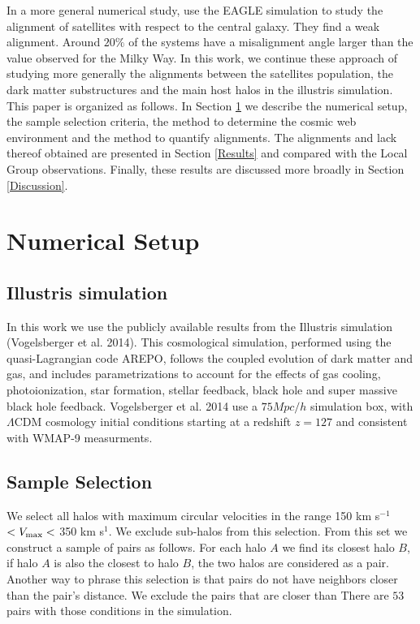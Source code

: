 \documentclass{emulateapj}
\begin{document}
In a more general numerical study,   
\cite{2016arXiv160501728S} use the EAGLE simulation to study the
alignment of satellites with respect to the central galaxy. They find
a weak alignment. Around $20\%$ of the systems have a misalignment
angle larger than the value observed for the Milky Way.
In this work, we continue these approach of studying more generally the alignments between the satellites population, the dark matter substructures and the main host halos in the illustris simulation. This paper is organized as follows. 
In Section \ref{NumericalSetup} we describe the numerical setup, the sample selection criteria, the method to determine the cosmic web environment and the method to quantify alignments. 
The alignments and lack thereof obtained are presented in Section \ref{Results} and compared with the Local Group observations.
Finally, these results are discussed more broadly in Section \ref{Discussion}.



\section{Numerical Setup}\label{NumericalSetup}

\subsection{Illustris simulation}

In this work we use the publicly available results from the Illustris
simulation (Vogelsberger et al. 2014). This cosmological simulation, performed using
the quasi-Lagrangian code AREPO, follows the coupled evolution of dark
matter and gas, and includes parametrizations to account for the effects of
gas cooling, photoionization, star formation, stellar feedback, black
hole and super massive black hole feedback. Vogelsberger et al. 2014 use a $75 Mpc/h$
simulation box, with $\Lambda$CDM cosmology initial conditions
starting at a redshift $z=127$ and consistent with WMAP-9 measurments.

\subsection{Sample Selection}

We select all halos with maximum circular velocities in the
range 150 km s$^{-1}$ $<V_{\rm max}<$ 350 km s$^{1}$.
We exclude sub-halos from this selection.
From this set we construct a sample of pairs as follows.
For each halo $A$ we find its closest halo $B$, if halo $A$ is also
the closest to halo $B$, the two halos are considered as a pair. 
Another way to phrase this selection is that pairs do not have
neighbors closer than the pair's distance.
We exclude the pairs that are closer than
There are $53$ pairs with those conditions in the simulation.
\end{document}
